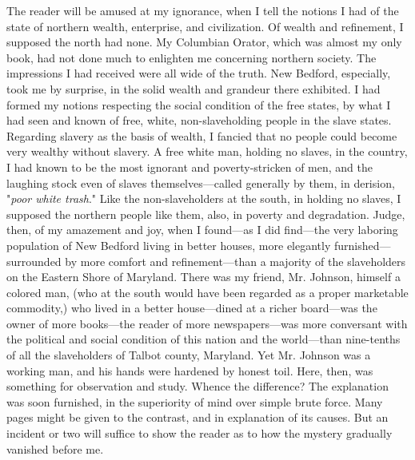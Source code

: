 The reader will be amused at my ignorance, when I tell the notions I had
of the state of northern wealth, enterprise, and civilization. Of wealth
and refinement, I supposed the north had none. My Columbian Orator,
which was almost my only book, had not done much to enlighten me
concerning northern society. The impressions I had received were all
wide of the truth. New Bedford, especially, took me by surprise, in the
solid wealth and grandeur there
{\protect\hypertarget{344}{}{}}exhibited. I had formed my notions
respecting the social condition of the free states, by what I had seen
and known of free, white, non-slaveholding people in the slave states.
Regarding slavery as the basis of wealth, I fancied that no people could
become very wealthy without slavery. A free white man, holding no
slaves, in the country, I had known to be the most ignorant and
poverty-stricken of men, and the laughing stock even of slaves
themselves---called generally by them, in derision, "\emph{poor white
trash}." Like the non-slaveholders at the south, in holding no slaves, I
supposed the northern people like them, also, in poverty and
degradation. Judge, then, of my amazement and joy, when I found---as I
did find---the very laboring population of New Bedford living in better
houses, more elegantly furnished---surrounded by more comfort and
refinement---than a majority of the slaveholders on the Eastern Shore of
Maryland. There was my friend, Mr. Johnson, himself a colored man, (who
at the south would have been regarded as a proper marketable commodity,)
who lived in a better house---dined at a richer board---was the owner of
more books---the reader of more newspapers---was more conversant with
the political and social condition of this nation and the world---than
nine-tenths of all the slaveholders of Talbot county, Maryland. Yet Mr.
Johnson was a working man, and his hands were hardened by honest toil.
Here, then, was something for observation and study. Whence the
difference? The explanation was soon furnished, in the superiority of
mind over simple brute force. Many pages might be given to the contrast,
and in {\protect\hypertarget{345}{}{}}explanation of its causes. But an
incident or two will suffice to show the reader as to how the mystery
gradually vanished before me.

